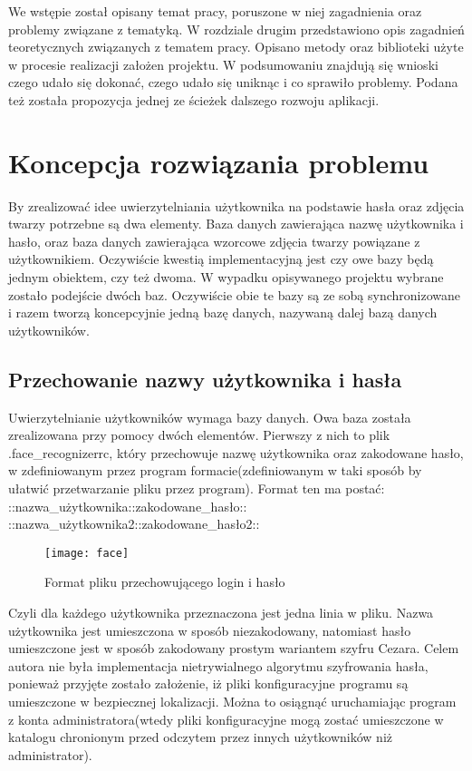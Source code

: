 \documentclass[eng,printmode]{mgr}
\begin{document}
We wstępie został opisany temat pracy, poruszone w niej zagadnienia oraz problemy związane z tematyką. W rozdziale drugim przedstawiono opis zagadnień teoretycznych związanych z tematem pracy. Opisano metody oraz biblioteki użyte w procesie realizacji założen projektu. W podsumowaniu znajdują się wnioski czego udało się dokonać, czego udało się uniknąc i co sprawiło problemy. Podana też została propozycja jednej ze ścieżek dalszego rozwoju aplikacji.
\section{Koncepcja rozwiązania problemu}

By zrealizować idee uwierzytelniania użytkownika na podstawie hasła oraz zdjęcia twarzy potrzebne są dwa elementy. Baza danych zawierająca nazwę użytkownika i hasło, oraz baza danych zawierająca wzorcowe zdjęcia twarzy powiązane z użytkownikiem. Oczywiście kwestią implementacyjną jest czy owe bazy będą jednym obiektem, czy też dwoma. W wypadku opisywanego projektu wybrane zostało podejście dwóch baz. Oczywiście obie te bazy są ze sobą synchronizowane i razem tworzą koncepcyjnie jedną bazę danych, nazywaną dalej bazą danych użytkowników.
\subsection{Przechowanie nazwy użytkownika i hasła}

Uwierzytelnianie użytkowników wymaga bazy danych. Owa baza została zrealizowana przy pomocy dwóch elementów. Pierwszy z nich to plik .face\_recognizerrc, który przechowuje nazwę użytkownika oraz zakodowane hasło, w zdefiniowanym przez program formacie(zdefiniowanym w taki sposób by ułatwić przetwarzanie pliku przez program). Format ten ma postać:\\
::nazwa\_użytkownika::zakodowane\_hasło::\\
::nazwa\_użytkownika2::zakodowane\_hasło2:: \\
\begin{figure}[placement h]
\texttt{[image: face]}
\caption{Format pliku przechowującego login i hasło}
\end{figure}

Czyli dla każdego użytkownika przeznaczona jest jedna linia w pliku. Nazwa użytkownika jest umieszczona w sposób niezakodowany, natomiast hasło umieszczone jest w sposób zakodowany prostym wariantem szyfru Cezara. Celem autora nie była implementacja nietrywialnego algorytmu szyfrowania hasła, ponieważ przyjęte zostało założenie, iż pliki konfiguracyjne programu są umieszczone w bezpiecznej lokalizacji. Można to osiągnąć uruchamiając program z konta administratora(wtedy pliki konfiguracyjne mogą zostać umieszczone w katalogu chronionym przed odczytem przez innych użytkowników niż administrator).
\\
\end{document}
